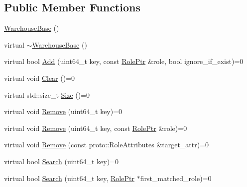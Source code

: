 \subsection*{Public Member Functions}
\begin{DoxyCompactItemize}
\item 
\hyperlink{classapollo_1_1cyber_1_1service__discovery_1_1WarehouseBase_a3d207c66e54fd0b38389bb8bf9ec32a4}{Warehouse\-Base} ()
\item 
virtual \hyperlink{classapollo_1_1cyber_1_1service__discovery_1_1WarehouseBase_ac691b3168e8d5e72aa2a0b2ea6694e07}{$\sim$\-Warehouse\-Base} ()
\item 
virtual bool \hyperlink{classapollo_1_1cyber_1_1service__discovery_1_1WarehouseBase_adf9fe2ed8875839b635f701f480504cf}{Add} (uint64\-\_\-t key, const \hyperlink{namespaceapollo_1_1cyber_1_1service__discovery_a47c65bbb4b41d9ae41bfbd33271df525}{Role\-Ptr} \&role, bool ignore\-\_\-if\-\_\-exist)=0
\item 
virtual void \hyperlink{classapollo_1_1cyber_1_1service__discovery_1_1WarehouseBase_a9cecd6e55fc85b08b47eafe9e1205d4d}{Clear} ()=0
\item 
virtual std\-::size\-\_\-t \hyperlink{classapollo_1_1cyber_1_1service__discovery_1_1WarehouseBase_ac7af8481d1770471effacbf7b7dd0b64}{Size} ()=0
\item 
virtual void \hyperlink{classapollo_1_1cyber_1_1service__discovery_1_1WarehouseBase_a27db5c1c3556b2ac5648dbb732043192}{Remove} (uint64\-\_\-t key)=0
\item 
virtual void \hyperlink{classapollo_1_1cyber_1_1service__discovery_1_1WarehouseBase_a03312166f883df1eb41afa6bb7cf6287}{Remove} (uint64\-\_\-t key, const \hyperlink{namespaceapollo_1_1cyber_1_1service__discovery_a47c65bbb4b41d9ae41bfbd33271df525}{Role\-Ptr} \&role)=0
\item 
virtual void \hyperlink{classapollo_1_1cyber_1_1service__discovery_1_1WarehouseBase_a2b1a87fa8806f212f5502e2d6fe2f30b}{Remove} (const proto\-::\-Role\-Attributes \&target\-\_\-attr)=0
\item 
virtual bool \hyperlink{classapollo_1_1cyber_1_1service__discovery_1_1WarehouseBase_a6c7a223edc8b3b02666c318c9992be02}{Search} (uint64\-\_\-t key)=0
\item 
virtual bool \hyperlink{classapollo_1_1cyber_1_1service__discovery_1_1WarehouseBase_a2294a1bae82fcb65a1f854a1e3d8f677}{Search} (uint64\-\_\-t key, \hyperlink{namespaceapollo_1_1cyber_1_1service__discovery_a47c65bbb4b41d9ae41bfbd33271df525}{Role\-Ptr} $\ast$first\-\_\-matched\-\_\-role)=0

\end{DoxyCompactItemize}
